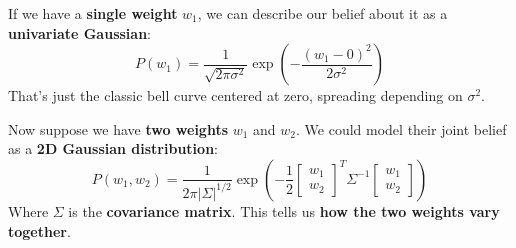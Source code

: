 \begin{deepeningbox}
    If we have a \textbf{single weight} $w_1$, we can describe our belief about it as a \textbf{univariate Gaussian}:
    \begin{equation*}
        P\left(w_1\right) = \dfrac{1}{\sqrt{2 \pi \sigma^2}} \exp\left(-\dfrac{\left(w_1 - 0\right)^2}{2 \sigma^2}\right)
    \end{equation*}
    That's just the classic bell curve centered at zero, spreading depending on $\sigma^2$.

    \highspace
    Now suppose we have \textbf{two weights} $w_1$ and $w_2$. We could model their joint belief as a \textbf{2D Gaussian distribution}:
    \begin{equation*}
        P\left(w_1, w_2\right) = \dfrac{1}{2 \pi \left|\Sigma\right|^{1/2}} \exp\left(-\dfrac{1}{2} \begin{bmatrix} w_1 \\ w_2 \end{bmatrix}^T \Sigma^{-1} \begin{bmatrix} w_1 \\ w_2 \end{bmatrix}\right)
    \end{equation*}
    Where $\Sigma$ is the \textbf{covariance matrix}. This tells us \textbf{how the two weights vary together}.


\end{deepeningbox}
